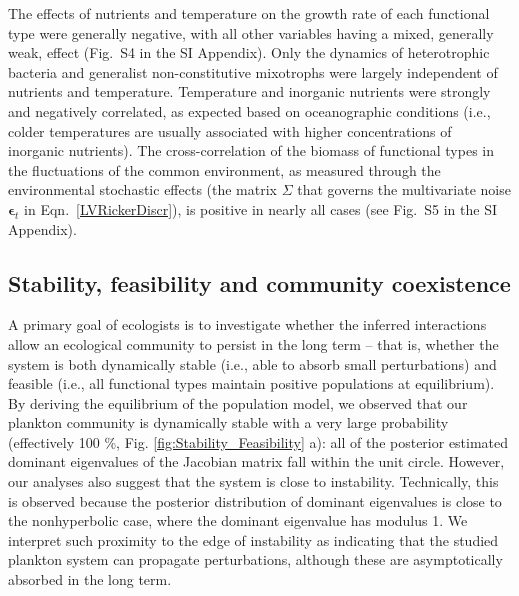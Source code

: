 \documentclass[12pt]{article}
\begin{document}
The effects of nutrients and temperature on the growth rate of each functional type were generally negative, with all other variables having a mixed, generally weak, effect (Fig.~S4 in the SI Appendix). Only the dynamics of heterotrophic bacteria and generalist non-constitutive mixotrophs were largely independent of nutrients and temperature. Temperature and inorganic nutrients were strongly and negatively correlated, as expected based on oceanographic conditions (i.e., colder temperatures are usually associated with higher concentrations of inorganic nutrients). The cross-correlation of the biomass of functional types in the fluctuations of the common environment, as measured through the environmental stochastic effects (the matrix $\Sigma$ that governs the multivariate noise $\boldsymbol{\epsilon}_{t}$ in Eqn.~\ref{LVRickerDiscr}), is positive in nearly all cases (see Fig.~S5 in the SI Appendix).

\subsection*{Stability, feasibility and community coexistence}

A primary goal of ecologists is to investigate whether the inferred interactions allow an ecological community to persist in the long term -- that is, whether the system is both dynamically stable (i.e., able to absorb small perturbations) and feasible (i.e., all functional types maintain positive populations at equilibrium). By deriving the equilibrium of the population model, we observed that our plankton community is dynamically stable with a very large probability (effectively 100 \%, Fig. \ref{fig:Stability_Feasibility} a): all of the posterior estimated dominant eigenvalues of the Jacobian matrix fall within the unit circle. However, our analyses also suggest that the system is close to instability. Technically, this is observed because the posterior distribution of dominant eigenvalues is close to the nonhyperbolic case, where the dominant eigenvalue has modulus 1. We interpret such proximity to the edge of instability as indicating that the studied plankton system can propagate perturbations, although these are asymptotically absorbed in the long term.
\end{document}
